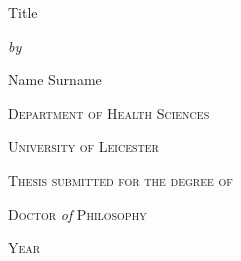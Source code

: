 
\begin{titlepage}
	\begin{center}
		\doublespacing
		\vspace*{3em}
		{	\Huge
			Title \par
		}
		\vspace*{0.5em}
		\textit{by} \par
		\vspace*{0.5em}
		{	\LARGE
			Name Surname \par
		}
		\vfill
		\textsc{Department of Health Sciences} \par
		\textsc{University of Leicester} \par
		\vspace*{1.5em}
		\textsc{Thesis submitted for the degree of} \par
		\textsc{Doctor} \textit{of} \textsc{Philosophy} \par
		\vspace*{1.5em}
		{	\Large
			\textsc{Year}
		}
	\end{center}
\end{titlepage}

